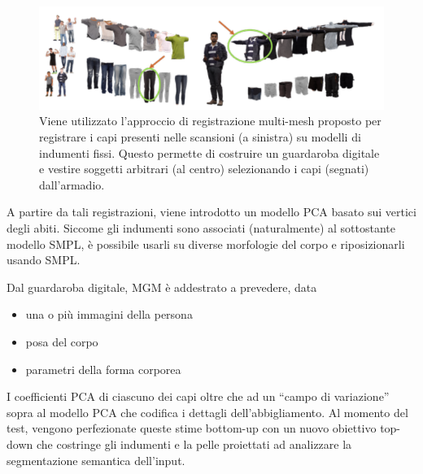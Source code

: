 \medskip

\begin{figure}[ht!]
  \centering
  \includegraphics[scale=0.6]{Images/SizerPic/Sizer3.png}
  \caption{Viene utilizzato l'approccio di registrazione multi-mesh proposto per registrare i capi presenti nelle scansioni (a sinistra) su
modelli di indumenti fissi. Questo permette di costruire un guardaroba digitale e vestire soggetti arbitrari (al centro) selezionando i capi (segnati)
dall'armadio.}
    \label{fig:Sizer3}
\end{figure}

\medskip

A partire da tali registrazioni, viene introdotto un modello PCA basato sui vertici degli abiti.
Siccome gli indumenti sono associati (naturalmente) al sottostante modello SMPL, è possibile usarli su diverse morfologie del corpo e riposizionarli usando SMPL.

\medskip

Dal guardaroba digitale, MGM è addestrato a prevedere, data 
\begin{itemize}
\item una o più immagini della persona
\item posa del corpo
\item parametri della forma corporea
\end{itemize}

\medskip

I coefficienti PCA di ciascuno dei capi oltre che ad un “campo di variazione” sopra al modello PCA che codifica i dettagli dell’abbigliamento.
Al momento del test, vengono perfezionate queste stime bottom-up
con un nuovo obiettivo top-down che costringe gli indumenti e la pelle proiettati ad analizzare la segmentazione semantica dell'input.

\medskip

